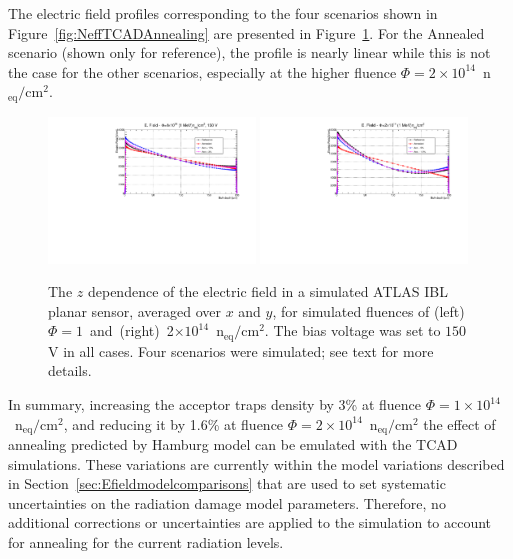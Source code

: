 The electric field profiles corresponding to the four scenarios shown in Figure~\ref{fig:NeffTCADAnnealing} are presented in Figure~\ref{fig:EFieldTCADAnnealing}.   For the Annealed scenario (shown only for reference), the profile is nearly linear while this is not the case for the other scenarios, especially at the higher fluence $\Phi=2\times10^{14}$~n$_\text{eq}/\text{cm}^{2}$.  


\begin{figure}[!htpb]
\centering
\includegraphics[width=0.49\textwidth]{TCAD_EField_variations_1e14_150V.pdf}
\includegraphics[width=0.49\textwidth]{TCAD_EField_variations_2e14_150V.pdf}
\caption{\label{fig:EFieldTCADAnnealing}The $z$ dependence of the electric field in a simulated ATLAS IBL planar sensor, averaged over $x$ and $y$, for  simulated
  fluences of (left)~$\Phi=1$~and~(right)~2$\times10^{14}$~n$_\text{eq}/\text{cm}^{2}$. The
bias voltage was set to $150$ V in all cases. Four scenarios were simulated; see text for more 
  details.}
\end{figure}

In summary, increasing the acceptor traps density by 3\% at fluence 
$\Phi=1\times10^{14}$~n$_\text{eq}/\text{cm}^{2}$, and reducing it by 1.6\% 
at fluence $\Phi=2\times10^{14}$~n$_\text{eq}/\text{cm}^{2}$ the effect of annealing 
predicted by Hamburg model can be emulated with the TCAD simulations.   These variations are currently within the model variations described in Section~\ref{sec:Efieldmodelcomparisons} that are used to set systematic uncertainties on the radiation damage model parameters.  Therefore, no additional corrections or uncertainties are applied to the simulation to account for annealing for the current radiation levels.


